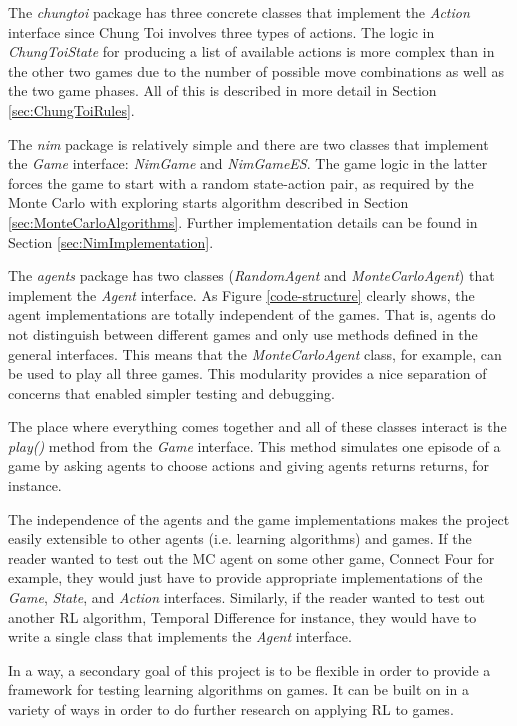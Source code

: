 \documentclass[11pt,a4paper,twoside,openright]{report}
\begin{document}
The \emph{chungtoi} package has three concrete classes that implement the \emph{Action} interface since Chung Toi involves three types of actions. The logic in \emph{ChungToiState} for producing a list of available actions is more complex than in the other two games due to the number of possible move combinations as well as the two game phases. All of this is described in more detail in Section \ref{sec:ChungToiRules}.

The \emph{nim} package is relatively simple and there are two classes that implement the \emph{Game} interface: \emph{NimGame} and \emph{NimGameES}. The game logic in the latter forces the game to start with a random state-action pair, as required by the Monte Carlo with exploring starts algorithm described in Section \ref{sec:MonteCarloAlgorithms}. Further implementation details can be found in Section \ref{sec:NimImplementation}.

The \emph{agents} package has two classes (\emph{RandomAgent} and \emph{MonteCarloAgent}) that implement the \emph{Agent} interface. As Figure \ref{code-structure} clearly shows, the agent implementations are totally independent of the games. That is, agents do not distinguish between different games and only use methods defined in the general interfaces. This means that the \emph{MonteCarloAgent} class, for example, can be used to play all three games. This modularity provides a nice separation of concerns that enabled simpler testing and debugging.

The place where everything comes together and all of these classes interact is the \emph{play()} method from the \emph{Game} interface. This method simulates one episode of a game by asking agents to choose actions and giving agents returns returns, for instance.

The independence of the agents and the game implementations makes the project easily extensible to other agents (i.e. learning algorithms) and games. If the reader wanted to test out the MC agent on some other game, Connect Four for example, they would just have to provide appropriate implementations of the \emph{Game}, \emph{State}, and \emph{Action} interfaces. Similarly, if the reader wanted to test out another RL algorithm, Temporal Difference for instance, they would have to  write a single class that implements the \emph{Agent} interface.

In a way, a secondary goal of this project is to be flexible in order to provide a framework for testing learning algorithms on games. It can be built on in a variety of ways in order to do further research on applying RL to games.
\end{document}
